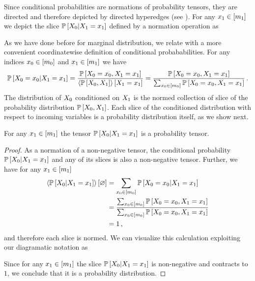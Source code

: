 Since conditional probabilities are normations of probability tensors, they are directed and therefore depicted by directed hyperedges (see ).
For any $x_{1}\in[m_{1}]$ we depict the slice $\mathbb{P}\left[X_{0}|X_{1}=x_{1}\right]$ defined by a normation operation as
\begin{center}
    
\end{center}

As we have done before for marginal distribution, we relate  with a more convenient coordinatewise definition of conditional probababilities.
For any indices $x_{0}\in[m_{0}]$ and $x_{1}\in[m_{1}]$ we have
\begin{align*}
    \mathbb{P}\left[X_{0}=x_{0}|X_{1}=x_{1}\right]
    = \frac{\mathbb{P}\left[X_{0}=x_{0},X_{1}=x_{1}\right]}{\left\langle \mathbb{P}\left[X_{0},X_{1}\right]\right\rangle \left[ X_{1}=x_{1} \right]}
    = \frac{\mathbb{P}\left[X_{0}=x_{0},X_{1}=x_{1}\right]}{\sum_{x_{0}\in[m_{0}]} \mathbb{P}\left[X_{0}=x_{0},X_{1}=x_{1}\right]} \, .
\end{align*}
The distribution of $X_{0}$ conditioned on $X_{1}$ is the normed collection of slice of the probability distribution $\mathbb{P}\left[X_{0},X_{1}\right]$.
Each slice of the conditioned distribution with respect to incoming variables is a probability distribution itself, as we show next.

\begin{theorem}
    \label{the:conditionalContraction}
    For any $x_{1}\in[m_{1}]$ the tensor $\mathbb{P}\left[X_{0}|X_{1}=x_{1}\right]$ is a probability tensor.
\end{theorem}
\begin{proof}
    As a normation of a non-negative tensor, the conditional probability $\mathbb{P}\left[X_{0}|X_{1}=x_{1}\right]$ and any of its slices is also a non-negative tensor.
    Further, we have for any $x_{1}\in[m_{1}]$
    \begin{align*}
        \left\langle \mathbb{P}\left[X_{0}|X_{1}=x_{1}\right]\right\rangle \left[ \varnothing \right]
        & = \sum_{x_{0}\in[m_{0}]} \mathbb{P}\left[X_{0}=x_{0}|X_{1}=x_{1}\right] \\
        &= \frac{\sum_{x_{0}\in[m_{0}]}\mathbb{P}\left[X_{0}=x_{0},X_{1}=x_{1}\right]}{\sum_{x_{0}\in[m_{0}]}\mathbb{P}\left[X_{0}=x_{0},X_{1}=x_{1}\right]} \\
        &= 1 \, ,
    \end{align*}
    and therefore each slice is normed.
    We can visualize this calculation exploiting our diagramatic notation as
    \begin{center}
        
    \end{center}
    Since for any $x_{1}\in[m_{1}]$ the slice $\mathbb{P}\left[X_{0}|X_{1}=x_{1}\right]$ is non-negative and contracts to $1$, we conclude that it is a probability distribution.
\end{proof}

